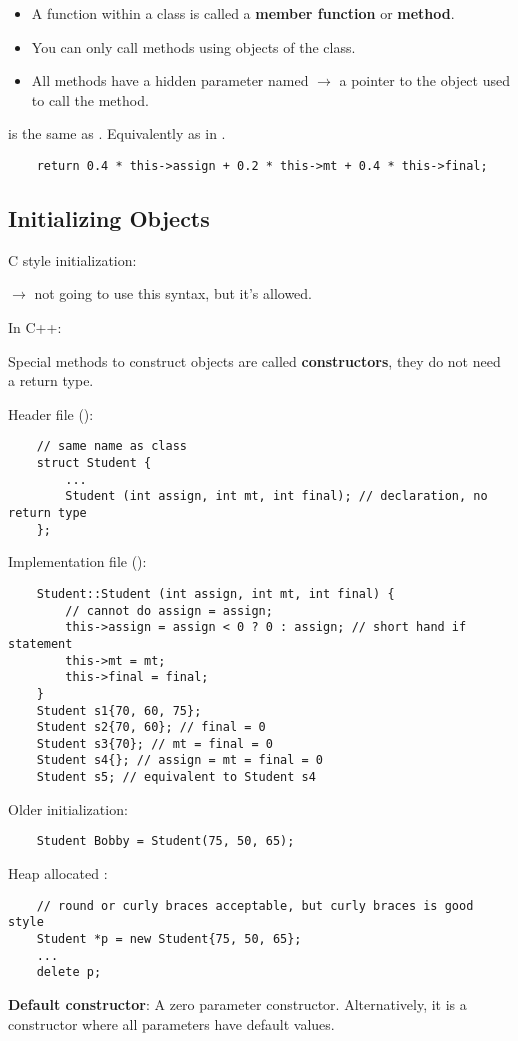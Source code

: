 \begin{itemize}
    \item A function within a class is called a \textbf{member function}
    or \textbf{method}.
    \item You can only call methods using objects of the class.
    \item All methods have a hidden parameter named 
    $ \rightarrow $ a pointer to the object used to call the method.
    \subitem {}
\end{itemize}
 is the same as . Equivalently as in
.
\begin{lstlisting}
    return 0.4 * this->assign + 0.2 * this->mt + 0.4 * this->final;
\end{lstlisting}

\subsection{Initializing Objects}
C style initialization:

 $ \rightarrow $ not going to use this syntax,
but it's allowed.

In C++:

Special methods to construct objects are called \textbf{constructors}, they do
not need a return type.

Header file ():
\begin{lstlisting}
    // same name as class
    struct Student {
        ...
        Student (int assign, int mt, int final); // declaration, no return type
    };
\end{lstlisting}
Implementation file ():
\begin{lstlisting}
    Student::Student (int assign, int mt, int final) {
        // cannot do assign = assign;
        this->assign = assign < 0 ? 0 : assign; // short hand if statement
        this->mt = mt;
        this->final = final;
    }
    Student s1{70, 60, 75};
    Student s2{70, 60}; // final = 0
    Student s3{70}; // mt = final = 0
    Student s4{}; // assign = mt = final = 0
    Student s5; // equivalent to Student s4
\end{lstlisting}
Older initialization:
\begin{lstlisting}
    Student Bobby = Student(75, 50, 65);
\end{lstlisting}
Heap allocated :
\begin{lstlisting}
    // round or curly braces acceptable, but curly braces is good style
    Student *p = new Student{75, 50, 65};
    ...
    delete p;
\end{lstlisting}
\textbf{Default constructor}:
A zero parameter constructor. Alternatively, it is a constructor
where all parameters have default values.

